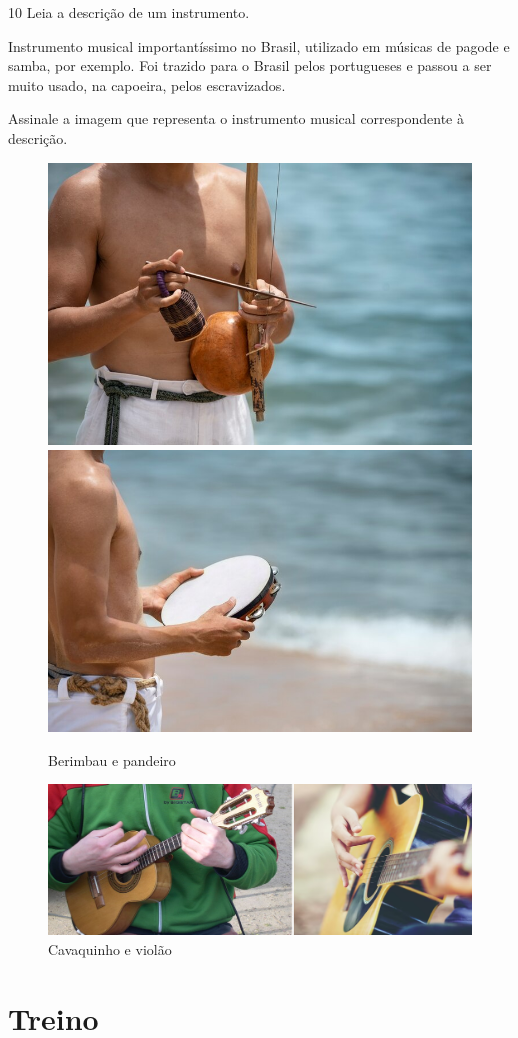 \num{10} Leia a descrição de um instrumento.

\begin{myquote}
Instrumento musical importantíssimo no Brasil, utilizado em músicas
de pagode e samba, por exemplo. Foi trazido para o Brasil pelos portugueses
e passou a ser muito usado, na capoeira, pelos escravizados.
\end{myquote}

Assinale a imagem que representa o instrumento musical correspondente à descrição.

\begin{figure}[htpb!]
\includegraphics[width=.5\textwidth]{./imgs/art19a.jpg}
\includegraphics[width=.5\textwidth]{./imgs/art19b.jpg}
\caption{Berimbau e pandeiro}
\end{figure}

\begin{figure}[htpb!]
\acima{( ) \hfill( )}
\includegraphics[width=\textwidth]{./imgs/art19cd.png}
\caption{Cavaquinho e violão}
\end{figure}

\section*{Treino}


